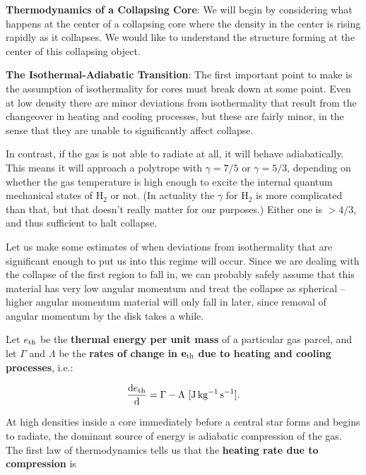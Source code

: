\documentclass[a4paper,10pt]{article}
\begin{document}
{\noindent}\textbf{Thermodynamics of a Collapsing Core}: We will begin by considering what happens at the center of a collapsing core where the density in the center is rising rapidly as it collapses. We would like to understand the structure forming at the center of this collapsing object.

{\noindent}\textbf{The Isothermal-Adiabatic Transition}: The first important point to make is the assumption of isothermality for cores must break down at some point. Even at low density there are minor deviations from isothermality that result from the changeover in heating and cooling processes, but these are fairly minor, in the sense that they are unable to significantly affect collapse. 

{\noindent}In contrast, if the gas is not able to radiate at all, it will behave adiabatically. This means it will approach a polytrope with $\gamma=7/5$ or $\gamma=5/3$, depending on whether the gas temperature is high enough to excite the internal quantum mechanical states of H$_2$ or not. (In actuality the $\gamma$ for H$_2$ is more complicated than that, but that doesn't really matter for our purposes.) Either one is $>4/3$, and thus sufficient to halt collapse.

{\noindent}Let us make some estimates of when deviations from isothermality that are significant enough to put us into this regime will occur. Since we are dealing with the collapse of the first region to fall in, we can probably safely assume that this material has very low angular momentum and treat the collapse as spherical -- higher angular momentum material will only fall in later, since removal of angular momentum by the disk takes a while.

{\noindent}Let $e_{\rm th}$ be the \textbf{thermal energy per unit mass} of a particular gas parcel, and let $\Gamma$ and $\Lambda$ be the \textbf{rates of change in} $\mathbf{e_{\rm th}}$ \textbf{due to heating and cooling processes}, i.e.:

\begin{align*}
    \frac{{\rm d}e_{\rm th}}{{\rm d}} = \Gamma - \Lambda ~ [{\rm J\,kg^{-1}\,s^{-1}}].
\end{align*}

{\noindent}At high densities inside a core immediately before a central star forms and begins to radiate, the dominant source of energy is adiabatic compression of the gas. The first law of thermodynamics tells us that the \textbf{heating rate due to compression} is
\end{document}
